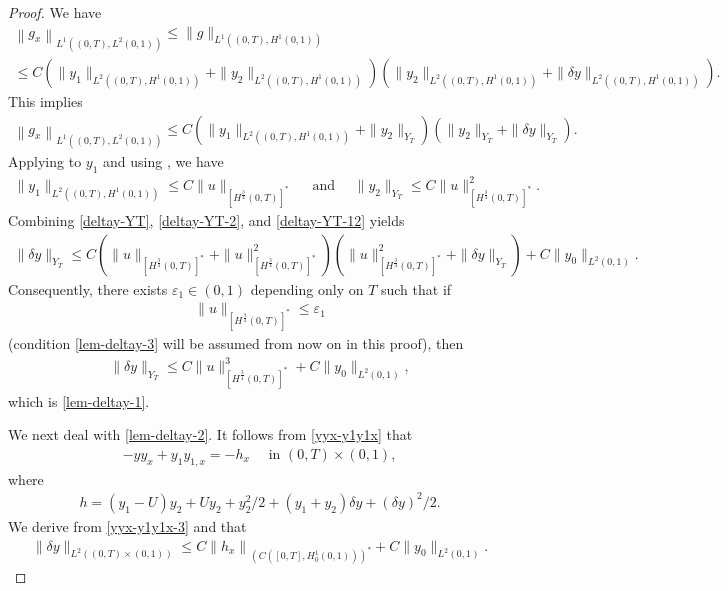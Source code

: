 \documentclass[11pt, reqno]{amsart}
\newcommand{\eps}{\varepsilon}
\theoremstyle{plain}
\numberwithin{equation}{section}
\begin{document}
\begin{proof}
We have
	\begin{multline*}	
	\left\| g_x \right\|_{L^1((0, T), L^2(0, 1))} \leq \|g\|_{L^1((0, T), H^1(0, 1))} \\[6pt] \leq C \left(\|y_1\|_{L^2((0, T), H^1(0, 1))} + \|y_2\|_{L^2((0, T), H^1(0, 1))} \right) \left(\|y_2\|_{L^2((0, T), H^1(0, 1))}  + \|\delta y\|_{L^2((0, T), H^1(0, 1))} \right). 
	\end{multline*}
	This  implies 
	\begin{align}	\label{deltay-YT-2}
	\left\| g_x \right\|_{L^1((0, T), L^2(0, 1))} 		\leq C \left( \|y_1\|_{L^2((0, T), H^1(0, 1))} + \|y_2\|_{Y_T}\right) \left( \|y_2\|_{Y_T} + \|\delta y\|_{Y_T} \right). 
	\end{align}
Applying  to $y_1$ and using , we have 
\begin{align} \label{deltay-YT-12}
\|y_1\|_{L^2((0, T), H^1(0, 1))} \le C \|u\|_{[H^{\frac{3}{4}}(0, T)]^*} \quad \text{ and } \quad \|y_2\|_{Y_T} \le C \|u\|_{[H^{\frac{3}{4}}(0, T)]^*}^2. 
\end{align}
Combining  \eqref{deltay-YT}, \eqref{deltay-YT-2}, and \eqref{deltay-YT-12} yields 
\begin{align}	 
\|\delta y\|_{Y_T} \leq 	 C \left( \|u\|_{[H^{\frac{3}{4}}(0, T)]^*} +  \|u\|_{[H^{\frac{3}{4}}(0, T)]^*}^2 \right) \left(  \|u\|_{[H^{\frac{3}{4}}(0, T)]^*}^2  + \|\delta y\|_{Y_T} \right) + C \|y_0\|_{L^2(0, 1)}.
	\end{align}
Consequently, there exists $\eps_1 \in (0, 1)$ depending only on $T$ such that if
\begin{align}	\label{lem-deltay-3}
\|u\|_{[H^{\frac{3}{4}}(0, T)]^*}  \le \eps_1
\end{align}
(condition \eqref{lem-deltay-3} will be assumed from now on in this proof), 
then
\begin{align}\label{lem-deltay-YT-p1}
	\|\delta y\|_{Y_T} \leq C \|u\|^3_{[H^{\frac{3}{4}}(0, T)]^*}  + C \|y_0\|_{L^2(0, 1)}, 
\end{align}
which is \eqref{lem-deltay-1}. 

	
\medskip	
	
We next deal with \eqref{lem-deltay-2}. It follows from 	\eqref{yyx-y1y1x} that
\begin{align}	\label{yyx-y1y1x-3}
	 -y y_x + y_1 y_{1, x} = - h_x \quad \text{ in } (0, T) \times (0, 1),
\end{align}
where
\begin{align}	\label{yyx-y1y1x-3'}
h = (y_1 - U) y_2 + U y_2 + y_2^2/2 + (y_1 + y_2) \delta y + (\delta y)^2/2.
\end{align}
We derive from \eqref{yyx-y1y1x-3} and  that 
	\begin{align} \label{deltay-L2}
		\|\delta y\|_{L^2((0, T) \times (0, 1))} \leq   
		 C \left\| h_x \right\|_{\left(C \left([0, T], H^1_0(0, 1) \right)  \right)^*} +  C \|y_0\|_{L^2(0, 1)}. 
	\end{align}
	

\end{proof}
\end{document}
